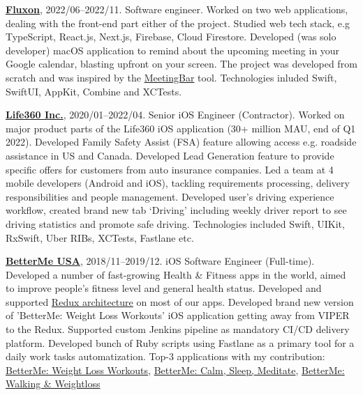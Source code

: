 \documentclass{hamsternik.cv}
\begin{document}
\vspace*{14px}

\textbf{\href{https://www.fluxon.com/}{Fluxon}}, 2022/06--2022/11.
Software engineer.
\newline Worked on two web applications, dealing with the front-end part either of the project.
Studied web tech stack, e.g TypeScript, React.js, Next.js, Firebase, Cloud Firestore.
\newline Developed (was solo developer) macOS application to remind about the upcoming meeting 
in your Google calendar, blasting upfront on your screen. The project was developed from scratch and 
was inspired by the \href{https://github.com/leits/MeetingBar}{MeetingBar} tool.
Technologies inluded Swift, SwiftUI, AppKit, Combine and XCTests.

\vspace*{14px}

\textbf{\href{https://www.life360.com}{Life360 Inc.}}, 2020/01--2022/04. 
Senior iOS Engineer (Contractor).
\newline Worked on major product parts of the Life360 iOS application 
(30+ million MAU, end of Q1 2022). Developed Family Safety Assist (FSA) feature allowing access 
e.g. roadside assistance in US and Canada. Developed Lead Generation feature to provide specific offers 
for customers from auto insurance companies. Led a team at 4 mobile developers (Android and iOS), 
tackling requirements processing, delivery responsibilities and people management. Developed user's 
driving experience workflow, created brand new tab ‘Driving’ including weekly driver report 
to see driving statistics and promote safe driving.\newline
Technologies included Swift, UIKit, RxSwift, Uber RIBs, XCTests, Fastlane etc.

\vspace*{14px}

\textbf{\href{https://betterme.world/about}{BetterMe USA}}, 2018/11--2019/12. 
iOS Software Engineer (Full-time).
\newline Developed a number of fast-growing Health \& Fitness apps in the world, 
aimed to improve people’s fitness level and general health status. Developed and supported 
\href{https://www.raywenderlich.com/books/advanced-ios-app-architecture/v3.0/chapters/6-architecture-redux}{Redux architecture} 
on most of our apps. Developed brand new version of 'BetterMe: Weight Loss Workouts' iOS application 
getting away from VIPER to the Redux. Supported custom Jenkins pipeline as mandatory CI/CD delivery platform. 
Developed bunch of Ruby scripts using Fastlane as a primary tool for a daily work tasks automatization.
\newline Top-3 applications with my contribution: 
\href{https://apps.apple.com/us/app/betterme-weight-loss-workouts/id1264546236}{BetterMe: Weight Loss Workouts}, 
\href{https://apps.apple.com/us/app/betterme-calm-sleep-meditate/id1363010081}{BetterMe: Calm, Sleep, Meditate}, 
\href{https://apps.apple.com/us/app/betterme-walking-weightloss/id1434400695}{BetterMe: Walking \& Weightloss}
\end{document}
